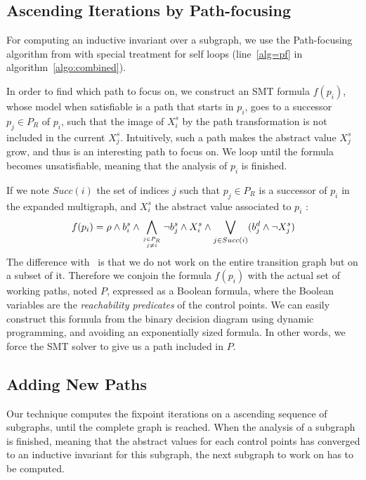 \documentclass{llncs}
\newcommand{\MM}[1]{{\color{blue} TODO(MM): #1}}
\newcommand{\MM}[1]{}
\begin{document}
\subsection{Ascending Iterations by Path-focusing}
\label{subsec:ascending}


For computing an inductive invariant over a subgraph, we use the
Path-focusing algorithm from \cite{Monniaux_Gonnord_SAS11} with special
treatment for self loops (line~\ref{alg=pf} in algorithm~\ref{algo:combined}).

In order to find which path to focus on, we construct an SMT formula $f(p_i)$, whose
model when satisfiable is a path that starts in $p_i$, goes to a successor $p_j
\in P_R$ of $p_i$, such that the image of $X_{i}^s$ by the path transformation
is not included in the current $X_{j}^s$.
Intuitively, such a path makes the abstract value $X_{j}^s$ grow, and thus is
an interesting path to focus on. We loop until the formula becomes unsatisfiable,
meaning that the analysis of $p_i$ is finished.

If we note $Succ(i)$ the set of indices $j$ such that $p_j \in P_R$ is a
successor of $p_i$ in the expanded multigraph, and $X_i^s$ the abstract value
associated to $p_i$ :
\vspace{-.5em}
\[
f(p_i) = \rho \wedge b_i^s \wedge 
\displaystyle\bigwedge_{j \in P_R \atop j \neq i} \neg
b_j^s \wedge X_i^s \wedge \displaystyle\bigvee_{j \in Succ(i)} (b_j^d \wedge
 \neg X_j^s)
\vspace{-.1em}
\]
The difference with~\cite{Monniaux_Gonnord_SAS11} is that we do not
work on the entire transition graph but on a subset of it. Therefore we
conjoin the formula $f(p_i)$ with the actual set of working paths,
noted $P$, expressed as a Boolean formula, where the Boolean variables are the
\emph{reachability predicates} of the control points. We can easily construct
this formula from the binary decision diagram using dynamic programming, and
avoiding an exponentially sized formula. In other words, we force the SMT solver
to give us a path included in $P$.


\subsection{Adding New Paths}
\label{subsec:addingpaths}

Our technique computes the fixpoint iterations on a ascending sequence of
subgraphs, until the complete graph is reached.
When the analysis of a subgraph is finished, meaning that the abstract values
for each control points has converged to an inductive invariant for this subgraph,
the next subgraph to work on has to be computed.
\end{document}

